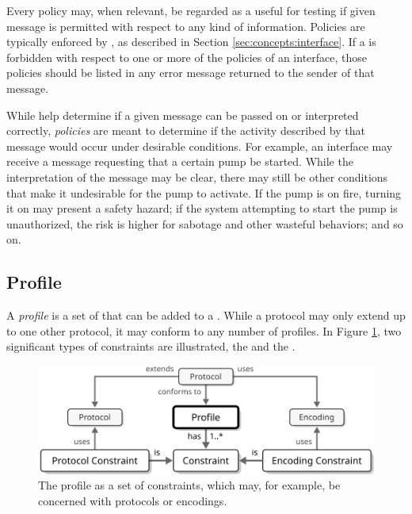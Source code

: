 Every policy may, when relevant, be regarded as a  useful for testing if given message is permitted with respect to any kind of information.
Policies are typically enforced by , as described in Section \ref{sec:concepts:interface}.
If a  is forbidden with respect to one or more of the policies of an interface, those policies should be listed in any error message returned to the sender of that message.

While  help determine if a given message can be passed on or interpreted correctly, \textit{policies} are meant to determine if the activity described by that message would occur under desirable conditions.
For example, an interface may receive a message requesting that a certain pump be started.
While the interpretation of the message may be clear, there may still be other conditions that make it undesirable for the pump to activate.
If the pump is on fire, turning it on may present a safety hazard; if the system attempting to start the pump is unauthorized, the risk is higher for sabotage and other wasteful behaviors; and so on.

\newpage

\subsection{Profile}
\label{sec:concepts:profile}

A \textit{profile} is a set of  that can be added to a .
While a protocol may only extend up to one other protocol, it may conform to any number of profiles.
In Figure \ref{fig:profile}, two significant types of constraints are illustrated, the  and the .

\begin{figure}[ht!]
  \centering
  \includegraphics[scale=0.9]{figures/profile}
  \caption{
    The profile as a set of constraints, which may, for example, be concerned with protocols or encodings.
  }
  \label{fig:profile}
\end{figure}

